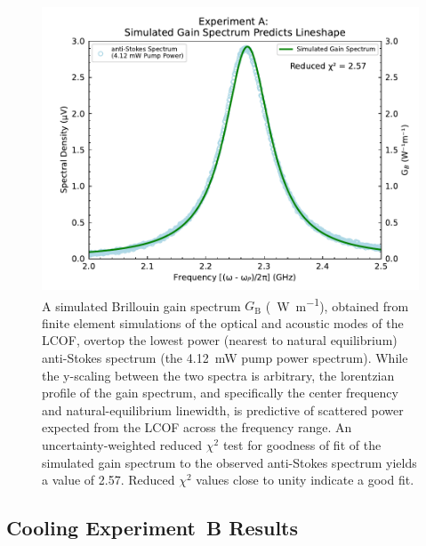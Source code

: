\begin{figure}[t!]
  \centering
  \includegraphics[width=\textwidth]{figs/2-Cooling/P-O Simulated Gain.pdf}
  \caption{A simulated Brillouin gain spectrum \(G_{\mathrm{B}}\) (\si{\per\watt\per\meter}), obtained from finite element simulations\cite{johnson2023laser} of the optical and acoustic modes of the \ac{LCOF}, overtop the lowest power (nearest to natural equilibrium) anti-Stokes spectrum (the \SI{4.12}{\milli\watt} pump power spectrum). While the y-scaling between the two spectra is arbitrary, the lorentzian profile of the gain spectrum, and specifically the center frequency and natural-equilibrium linewidth, is predictive of scattered power expected from the \ac{LCOF} across the frequency range. An uncertainty-weighted reduced \(\chi^{2}\) test for goodness of fit of the simulated gain spectrum to the observed anti-Stokes spectrum yields a value of 2.57. Reduced \(\chi^{2}\) values close to unity indicate a good fit.}
  \label{fig:Cooling:P-O Simulated Gain}
\end{figure}


\subsection{Cooling Experiment~B Results}
\label{Cooling:subsec:ExperimentBResults}

